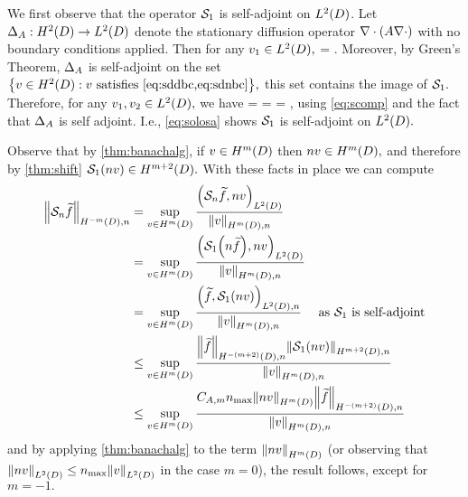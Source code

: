 We first observe that the operator $\mathcal S_{1}$ is self-adjoint on $\LtD$. Let $\DeltaA:\HtD\rightarrow\LtD$ denote the stationary diffusion operator $\grad\cdot\mleft(A\grad\cdot\mright)$ with no boundary conditions applied. Then for any $\vo \in \LtD,$
\beq\label{eq:scomp}
\DeltaA \circ \sdsolo \vo = \vo.
\eeq
Moreover, by Green's Theorem, $\Delta_{A}$ is self-adjoint on the set $\set{v \in \HtD \st v \text{ satisfies \cref{eq:sddbc,eq:sdnbc}}},$ this set contains the image of $\mathcal S_{1}.$ Therefore, for any $\vo,\vt \in \LtD,$ we have
\beq\label{eq:solosa}
\IPLtD{\sdsolo \vo}{\vt} =\IPLtD{\sdsolo \vo}{\DeltaA \circ \sdsolo \vt} = \IPLtD{\DeltaA \circ \sdsolo \vo}{\sdsolo \vt} = \IPLtD{\vo}{\sdsolo \vt},
\eeq
using \cref{eq:scomp} and the fact that $\Delta_{A}$ is self adjoint. I.e., \cref{eq:solosa} shows $\mathcal S_{1}$ is self-adjoint on $\LtD.$

Observe that by \cref{thm:banachalg}, if $v \in \HmD$ then $nv \in \HmD,$ and therefore by \cref{thm:shift} $\sdsolo(nv) \in \HmptD.$ With these facts in place we can compute
\begin{align*}
\NHnfn{-m}{D}{\sdsol \ftilde} &= \sup_{v \in \HmD} \frac{\IPLtD{\sdsol \ftilde}{nv}}{\NHmDn{v}}\\
&= \sup_{v \in \HmD} \frac{\IPLtD{\sdsolo\mleft(n \ftilde\mright)}{nv}}{\NHmDn{v}}\\
&= \sup_{v \in \HmD} \frac{\IPLtDn{\ftilde}{\sdsolo\mleft(n v\mright)}}{\NHmDn{v}}\quad\tas \sdsolo \text{ is self-adjoint}\\
&\leq \sup_{v \in \HmD} \frac{\NHnfn{-(m+2)}{D}{\ftilde}\NHnfn{m+2}{D}{\sdsolo\mleft(nv\mright)} }{\NHmDn{v}}\\
&\leq \sup_{v \in \HmD}  \frac{\CAfn{m} \nmax \NHmD{nv} \NHnfn{-(m+2)}{D}{\ftilde}}{\NHmDn{v}}
\end{align*}
and by applying \cref{thm:banachalg} to the term $\NHfn{m}{D}{nv}$ (or observing that $\NLtD{nv} \leq \nmax\NLtD{v}$ in the case $m=0$), the result follows, except for $m=-1.$

